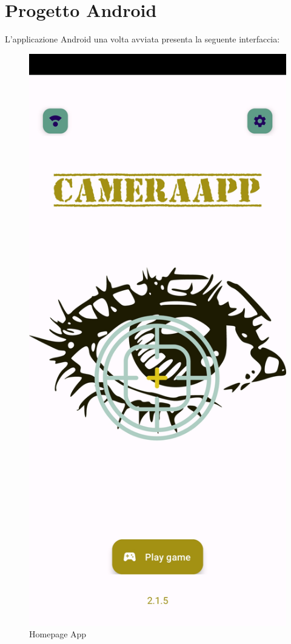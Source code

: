 \documentclass[11pt]{article}
\begin{document}
\section{Progetto Android}
\label{sec:and}
L'applicazione Android una volta avviata presenta la seguente interfaccia:

\begin{figure}[h]
\caption{Homepage App }
\centering
\includegraphics[scale=0.18]{img/CameraApp_Screen_home.jpg}
\end{figure}
\end{document}
